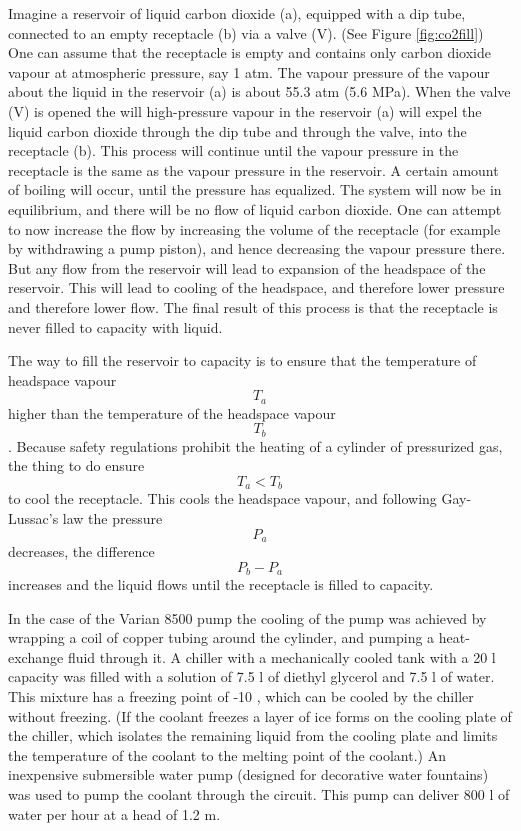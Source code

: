 Imagine a reservoir of liquid carbon dioxide (a), equipped with a dip tube,
connected to an empty receptacle (b) via a valve (V). (See Figure
\ref{fig:co2fill}) One can assume that the receptacle is empty and contains only
carbon dioxide vapour at atmospheric pressure, say 1 atm. The vapour pressure of
the vapour about the liquid in the reservoir (a) is about 55.3 atm (5.6 MPa).
When the valve (V) is opened the will high-pressure vapour in the reservoir (a)
will expel the liquid carbon dioxide through the dip tube and through the valve,
into the receptacle (b). This process will continue until the vapour pressure in
the receptacle is the same as the vapour pressure in the reservoir.
A certain amount of boiling will occur, until the pressure has equalized. The
system will now be in equilibrium, and there will be no flow of liquid carbon
dioxide. One can attempt to now increase the flow by increasing the volume of
the receptacle (for example by withdrawing a pump piston), and hence
decreasing the vapour pressure there. But any flow from the reservoir will lead
to expansion of the headspace of the reservoir. This will lead to cooling of the
headspace, and therefore lower pressure and therefore lower flow. The final
result of this process is that the receptacle is never filled to capacity with
liquid.

The way to fill the reservoir to capacity is to ensure that the temperature of
headspace vapour $$T_a$$ higher than the temperature of the headspace vapour
$$T_b$$. Because safety regulations prohibit the heating of a cylinder of
pressurized gas, the thing to do ensure $$T_a \lt T_b$$  to cool the receptacle.
This cools the headspace vapour, and following Gay-Lussac's law the pressure
$$P_a$$ decreases, the difference $$P_b - P_a$$ increases and the liquid flows
until the receptacle is filled to capacity.
 
In the case of the Varian 8500 pump the cooling of the pump was achieved by
wrapping a coil of copper tubing around the cylinder, and pumping a
heat-exchange fluid through it. A chiller with a mechanically cooled tank with a
20 l capacity was filled with a solution of 7.5 l of diethyl glycerol and 7.5 l
of water. This mixture has a freezing point of -10 \degreeCelsius, which can be
cooled by the chiller without freezing. (If the coolant freezes a layer of ice
forms on the cooling plate of the chiller, which isolates the remaining liquid
from the cooling plate and limits the temperature of the coolant to the melting
point of the coolant.) An inexpensive submersible water pump (designed for
decorative water fountains) was used to pump the coolant through the circuit.
This pump can deliver 800 l of water per hour at a head of 1.2 \si{\metre}.

